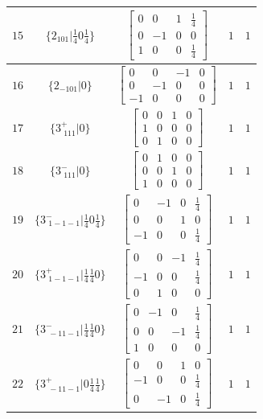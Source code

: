 \documentclass[fleqn,8pt]{jsarticle}
\begin{document}
\begin{longtable}{ccccc}
$ 15 $ & $ \{2{}_{101}|\frac{1}{4} 0 \frac{1}{4}\} $ & $ \begin{bmatrix} 0 & 0 & 1 & \frac{1}{4} \\ 0 & -1 & 0 & 0 \\ 1 & 0 & 0 & \frac{1}{4} \end{bmatrix} $ & $ 1 $ & $ 1 $ \\ \hline
$ 16 $ & $ \{2{}_{-101}|0\} $ & $ \begin{bmatrix} 0 & 0 & -1 & 0 \\ 0 & -1 & 0 & 0 \\ -1 & 0 & 0 & 0 \end{bmatrix} $ & $ 1 $ & $ 1 $ \\ \hline
$ 17 $ & $ \{3^{+}_{\,\,111}|0\} $ & $ \begin{bmatrix} 0 & 0 & 1 & 0 \\ 1 & 0 & 0 & 0 \\ 0 & 1 & 0 & 0 \end{bmatrix} $ & $ 1 $ & $ 1 $ \\ \hline
$ 18 $ & $ \{3^{-}_{\,\,111}|0\} $ & $ \begin{bmatrix} 0 & 1 & 0 & 0 \\ 0 & 0 & 1 & 0 \\ 1 & 0 & 0 & 0 \end{bmatrix} $ & $ 1 $ & $ 1 $ \\ \hline
$ 19 $ & $ \{3^{-}_{\,\,1-1-1}|\frac{1}{4} 0 \frac{1}{4}\} $ & $ \begin{bmatrix} 0 & -1 & 0 & \frac{1}{4} \\ 0 & 0 & 1 & 0 \\ -1 & 0 & 0 & \frac{1}{4} \end{bmatrix} $ & $ 1 $ & $ 1 $ \\ \hline
$ 20 $ & $ \{3^{+}_{\,\,1-1-1}|\frac{1}{4} \frac{1}{4} 0\} $ & $ \begin{bmatrix} 0 & 0 & -1 & \frac{1}{4} \\ -1 & 0 & 0 & \frac{1}{4} \\ 0 & 1 & 0 & 0 \end{bmatrix} $ & $ 1 $ & $ 1 $ \\ \hline
$ 21 $ & $ \{3^{-}_{\,\,-11-1}|\frac{1}{4} \frac{1}{4} 0\} $ & $ \begin{bmatrix} 0 & -1 & 0 & \frac{1}{4} \\ 0 & 0 & -1 & \frac{1}{4} \\ 1 & 0 & 0 & 0 \end{bmatrix} $ & $ 1 $ & $ 1 $ \\ \hline
$ 22 $ & $ \{3^{+}_{\,\,-11-1}|0 \frac{1}{4} \frac{1}{4}\} $ & $ \begin{bmatrix} 0 & 0 & 1 & 0 \\ -1 & 0 & 0 & \frac{1}{4} \\ 0 & -1 & 0 & \frac{1}{4} \end{bmatrix} $ & $ 1 $ & $ 1 $ \\ \hline

\end{longtable}
\end{document}
